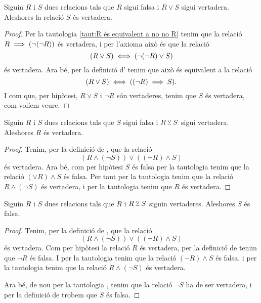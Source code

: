\documentclass[../Apunts.tex]{subfiles}
\begin{document}
	\begin{tautology}
		\label{taut:condicions per disjunció}
		Siguin \(R\) i \(S\) dues relacions tals que \(R\) sigui falsa i \(R\lor S\) sigui vertadera. Aleshores la relació \(S\) és vertadera.
		\begin{proof}
			Per la tautologia \ref{taut:R és equivalent a no no R} tenim que la relació \(R\implies(\lnot(\lnot R))\) és vertadera, i per l'axioma  això és que la relació
			\[(R\lor S)\iff(\lnot(\lnot R)\lor S)\]
			és vertadera. Ara bé, per la definició d' tenim que això és equivalent a la relació
			\[(R\lor S)\iff((\lnot R)\implies S).\]
			I com que, per hipòtesi, \(R\lor S\) i \(\lnot R\) són vertaderes, tenim que \(S\) és vertadera, com volíem veure.
		\end{proof}
	\end{tautology}
	\begin{tautology}
		\label{taut:disjunció excloent 1}
		Siguin \(R\) i \(S\) dues relacions tals que \(S\) sigui falsa i \(R\veebar S\) sigui vertadera. Aleshores \(R\) és vertadera.
		\begin{proof}
			Tenim, per la definició de , que la relació
			\[(R\land(\lnot S))\lor((\lnot R)\land S)\]
			és vertadera. Ara bé, com per hipòtesi \(S\) és falsa per la tautologia  tenim que la relació \((\lor R)\land S\) és falsa. Per tant per la tautologia  tenim que la relació \(R\land(\lnot S)\) és vertadera, i per la tautologia  tenim que \(R\) és vertadera.
		\end{proof}
	\end{tautology}
	\begin{tautology}
		\label{taut:disjunció excloent 2}
		Siguin \(R\) i \(S\) dues relacions tals que \(R\) i \(R\veebar S\) siguin vertaderes. Aleshores \(S\) és falsa.
		\begin{proof}
			Tenim, per la definició de , que la relació
			\[(R\land(\lnot S))\lor((\lnot R)\land S)\]
			és vertadera. Com per hipòtesi la relació \(R\) és vertadera, per la definició de  tenim que \(\lnot R\) és falsa. I per la tautologia  tenim que la relació \((\lnot R)\land S\) és falsa, i per la tautologia  tenim que la relació \(R\land(\lnot S)\) és vertadera.
			
			Ara bé, de nou per la tautologia , tenim que la relació \(\lnot S\) ha de ser vertadera, i per la definició de  trobem que \(S\) és falsa.
		\end{proof}
	\end{tautology}
\end{document}
